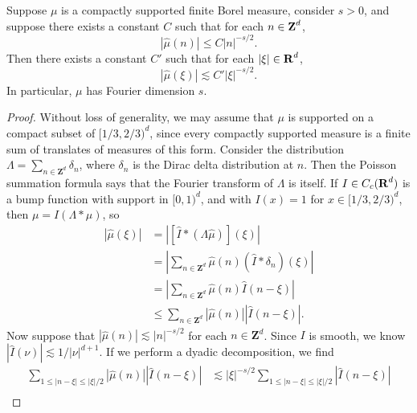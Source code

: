 \begin{lemma}
    Suppose $\mu$ is a compactly supported finite Borel measure, consider $s > 0$, and suppose there exists a constant $C$ such that for each $n \in \operatorname{\mathbf{Z}}^d$,
    \[ |\widehat{\mu}(n)| \leq C |n|^{-s/2}. \] 
    Then there exists a constant $C'$ such that for each $|\xi| \in \operatorname{\mathbf{R}}^d$,
    \[ |\widehat{\mu}(\xi)| \lesssim C' |\xi|^{-s/2}. \]
    In particular, $\mu$ has Fourier dimension $s$.
\end{lemma}
\begin{proof}
    Without loss of generality, we may assume that $\mu$ is supported on a compact subset of $[1/3,2/3)^d$, since every compactly supported measure is a finite sum of translates of measures of this form. Consider the distribution $\Lambda = \sum_{n \in \mathbf{Z}^d} \delta_n$, where $\delta_n$ is the Dirac delta distribution at $n$. Then the Poisson summation formula says that the Fourier transform of $\Lambda$ is itself. If $I \in C_c(\operatorname{\mathbf{R}}^d)$ is a bump function with support in $[0,1)^d$, and with $I(x) = 1$ for $x \in [1/3,2/3)^d$, then $\mu = I (\Lambda * \mu)$, so
    \begin{equation} \label{mubounded}
    \begin{split}
        |\widehat{\mu}(\xi)| &= \left| \left[ \widehat{I} * (\Lambda \widehat{\mu}) \right](\xi) \right|\\
        &= \left| \sum_{n \in \mathbf{Z}^d} \widehat{\mu}(n)(\widehat{I} * \delta_n)(\xi) \right|\\
        &= \left| \sum_{n \in \mathbf{Z}^d} \widehat{\mu}(n) \widehat{I}(n - \xi) \right|\\
        &\leq \sum_{n \in \mathbf{Z}^d} |\widehat{\mu}(n)| |\widehat{I}(n - \xi)|.
    \end{split}
    \end{equation}
    Now suppose that $|\widehat{\mu}(n)| \lesssim |n|^{-s/2}$ for each $n \in \mathbf{Z}^d$. Since $I$ is smooth, we know $|\widehat{I}(\nu)| \lesssim 1/|\nu|^{d+1}$. If we perform a dyadic decomposition, we find
    \begin{equation}
        \label{calculation1}
    \begin{split}
        \sum_{1 \leq |n - \xi| \leq |\xi|/2} |\widehat{\mu}(n)| |\widehat{I}(n - \xi)| &\lesssim |\xi|^{-s/2} \sum_{1 \leq |n - \xi| \leq |\xi|/2} |\widehat{I}(n - \xi)|\\

\end{split}
\end{equation}
\end{proof}

